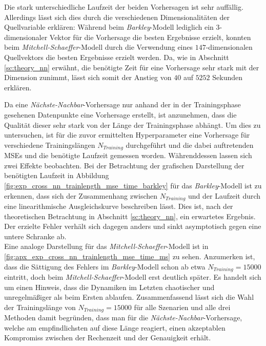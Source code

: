 Die stark unterschiedliche Laufzeit der beiden Vorhersagen ist sehr auffällig. Allerdings lässt sich dies durch die verschiedenen Dimensionalitäten der Quellvariable erklären: Während beim \textit{Barkley}-Modell lediglich ein $3$-dimensionaler Vektor für die Vorhersage die besten Ergebnisse erzielt, konnten beim \textit{Mitchell-Schaeffer}-Modell durch die Verwendung eines $147$-dimensionalen Quellvektors die besten Ergebnisse erzielt werden. Da, wie in Abschnitt \ref{sc:theory_nn} erwähnt, die benötigte Zeit für eine Vorhersage sehr stark mit der Dimension zunimmt, lässt sich somit der Anstieg von $40$ auf $5252$ Sekunden erklären.

Da eine \textit{Nächste-Nachbar}-Vorhersage nur anhand der in der Trainingsphase gesehenen Datenpunkte eine Vorhersage erstellt, ist anzunehmen, dass die Qualität dieser sehr stark von der Länge der Trainingsphase abhängt. Um dies zu untersuchen, ist für die zuvor ermittelten Hyperparameter eine Vorhersage für verschiedene Trainingslängen $N_{Training}$ durchgeführt und die dabei auftretenden MSEs und die benötigte Laufzeit gemessen worden. Währenddessen lassen sich zwei Effekte beobachten. Bei der Betrachtung der grafischen Darstellung der benötigten Laufzeit in Abbildung \ref{fig:exp_cross_nn_trainlength_mse_time_barkley} für das \textit{Barkley}-Modell ist zu erkennen, dass sich der Zusammenhang zwischen $N_{Training}$ und der Laufzeit durch eine linearithmische Ausgleichskurve beschreiben lässt. Dies ist, nach der theoretischen Betrachtung in Abschnitt \ref{sc:theory_nn}, ein erwartetes Ergebnis. Der erzielte Fehler verhält sich dagegen anders und sinkt asymptotisch gegen eine untere Schranke ab.\\

Eine analoge Darstellung für das \textit{Mitchell-Schaeffer}-Modell ist in \ref{fig:apx_exp_cross_nn_trainlength_mse_time_ms} zu sehen. Anzumerken ist, dass die Sättigung des Fehlers im \textit{Barkley}-Modell schon ab etwa $N_{Training}=15000$ eintritt, doch beim \textit{Mitchell-Schaeffer}-Modell erst deutlich später. Es handelt sich um einen Hinweis, dass die Dynamiken im Letzten chaotischer und unregelmäßiger als beim Ersten ablaufen. Zusammenfassend lässt sich die Wahl der Trainingslänge von $N_{Training} = 15000$ für alle Szenarien und alle drei Methoden damit begründen, dass man für die \textit{Nächste-Nachbar}-Vorhersage, welche am empfindlichsten auf diese Länge reagiert, einen akzeptablen Kompromiss zwischen der Rechenzeit und der Genauigkeit erhält.

